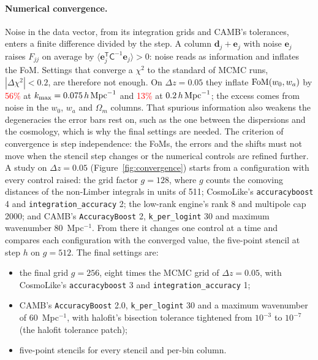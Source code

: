 \documentclass[11pt]{article}
\newcommand{\kmax}{k_{\rm max}}
\newcommand{\hMpc}{\,h\,{\rm Mpc}^{-1}}
\newcommand{\T}{^{\mathsf{T}}}
\newif\ifnumbersfinal
\newcommand{\refresh}[1]{\ifnumbersfinal#1\else\textcolor{red}{#1}\fi}
\newcommand{\MCMCdchi}{0.2}
\newcommand{\ConvMCMCLow}{\refresh{56\%}}
\newcommand{\ConvMCMCHigh}{\refresh{13\%}}
\newcommand{\GridConv}{512}
\newcommand{\GridStart}{128}
\newcommand{\GridFinal}{256}
\newcommand{\GridRatio}{eight}
\newcommand{\GridUnit}{511}
\newcommand{\FinAccBoost}{3}
\newcommand{\FinIntAcc}{1}
\newcommand{\FinCambBoost}{2.0}
\newcommand{\FinKlog}{30}
\newcommand{\FinKmax}{60}
\newcommand{\HalofitStock}{10^{-3}}
\newcommand{\HalofitPatch}{10^{-7}}
\newcommand{\StartAccBoost}{4}
\newcommand{\StartIntAcc}{2}
\newcommand{\StartRank}{8}
\newcommand{\StartCap}{2000}
\newcommand{\StartCambBoost}{2}
\newcommand{\StartKlog}{30}
\newcommand{\StartKmax}{80}
\begin{document}
\paragraph{Numerical convergence.}
Noise in the data vector, from its integration grids and CAMB's
tolerances, enters a finite difference divided by the step.  A column
$\mathbf{d}_j + \mathbf{e}_j$ with noise $\mathbf{e}_j$ raises $F_{jj}$
on average by $\langle\mathbf{e}_j\T\mathsf{C}^{-1}\mathbf{e}_j\rangle
> 0$: noise reads as information and inflates the FoM.  Settings that
converge a $\chi^2$ to the standard of MCMC runs,
$|\Delta\chi^2| < \MCMCdchi$, are therefore not enough.  On
$\Delta z = 0.05$ they inflate ${\rm FoM}(w_0, w_a)$ by \ConvMCMCLow{}
at $\kmax = 0.075\hMpc$ and \ConvMCMCHigh{} at $0.2\hMpc$; the excess
comes from
noise in the $w_0$, $w_a$ and $\Omega_m$ columns.  That spurious
information also weakens the degeneracies the error bars rest on, such
as the one between the dispersions and the cosmology, which is why the
final settings are
needed.  The criterion of
convergence is step independence: the FoMs, the errors and the shifts
must not move when the stencil step changes or the numerical controls
are refined further.  A study on $\Delta z = 0.05$
(Figure~\ref{fig:convergence}) starts from a configuration with every
control raised: the grid factor $g = \GridStart$, where $g$ counts the
comoving distances of the non-Limber integrals in units of
\GridUnit{}; CosmoLike's \texttt{accuracyboost} \StartAccBoost{} and
\texttt{integration\_accuracy} \StartIntAcc{}; the low-rank engine's
rank \StartRank{} and multipole cap \StartCap{}; and CAMB's
\texttt{AccuracyBoost} \StartCambBoost{}, \texttt{k\_per\_logint}
\StartKlog{} and maximum wavenumber \StartKmax{}~Mpc$^{-1}$.  From
there it changes one control at a time and compares each configuration
with the converged value, the five-point stencil at step $h$ on
$g = \GridConv$.  The final settings are:
\begin{itemize}
  \setlength{\itemsep}{1pt}
  \item the final grid $g = \GridFinal$, \GridRatio{} times the MCMC grid of
    $\Delta z = 0.05$, with CosmoLike's \texttt{accuracyboost}
    \FinAccBoost{} and \texttt{integration\_accuracy} \FinIntAcc{};
  \item CAMB's \texttt{AccuracyBoost} \FinCambBoost{},
    \texttt{k\_per\_logint} \FinKlog{} and a maximum wavenumber of
    \FinKmax{}~Mpc$^{-1}$, with halofit's bisection tolerance tightened
    from $\HalofitStock$ to $\HalofitPatch$ (the halofit tolerance
    patch);
  \item five-point stencils for every stencil and per-bin column.
\end{itemize}
\end{document}
